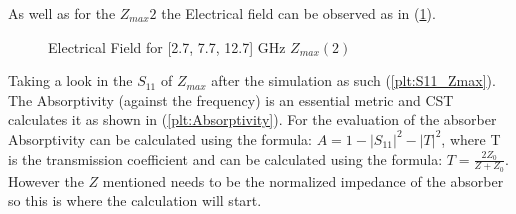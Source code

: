         As well as for the $Z_{max}2$ the Electrical field can be observed as in (\ref{img:E_Zmax2}).
        \begin{figure}[h]
            \centering
             \hfil
             \hfil

            \caption{Electrical Field for [2.7, 7.7, 12.7] GHz $Z_{max}(2)$}
            \label{img:E_Zmax2}
        \end{figure}

        Taking a look in the $S_{11}$ of $Z_{max}$ after the simulation as such (\ref{plt:S11_Zmax}).
        The Absorptivity (against the frequency) is an essential metric and CST calculates 
        it as shown in (\ref{plt:Absorptivity}).
        For the evaluation of the absorber Absorptivity can be calculated using the 
        formula: $ A = 1 - |S_{11}|^2 - |T|^2 $, where T is the transmission
        coefficient and can be calculated using the formula: $T = \frac{2Z_0}{Z+Z_0}$.
        However the $Z$ mentioned needs to be the normalized impedance of the absorber so this is where
        the calculation will start.


